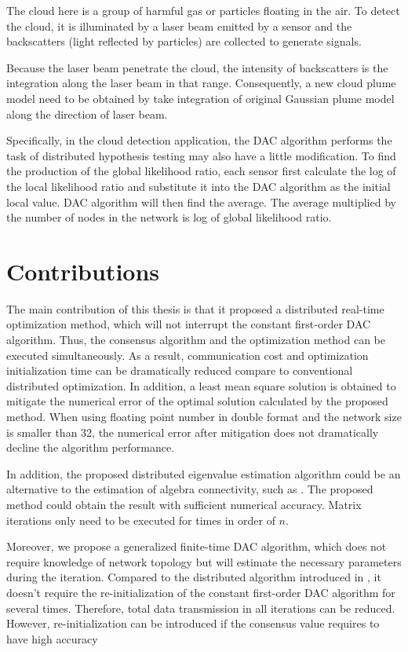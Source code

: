 The cloud here is a group of harmful gas or particles floating in
the air. To detect the cloud, it is illuminated by a laser beam emitted
by a sensor and the backscatters (light reflected by particles) are
collected to generate signals. 

Because the laser beam penetrate the cloud, the intensity of backscatters
is the integration along the laser beam in that range. Consequently,
a new cloud plume model need to be obtained by take integration of
original Gaussian plume model along the direction of laser beam. 

Specifically, in the cloud detection application, the DAC algorithm
performs the task of distributed hypothesis testing may also have
a little modification. To find the production of the global likelihood
ratio, each sensor first calculate the log of the local likelihood
ratio and substitute it into the DAC algorithm as the initial local
value. DAC algorithm will then find the average. The average multiplied
by the number of nodes in the network is log of global likelihood
ratio.


\section{Contributions}

The main contribution of this thesis is that it proposed a distributed
real-time optimization method, which will not interrupt the constant
first-order DAC algorithm. Thus, the consensus algorithm and the optimization
method can be executed simultaneously. As a result, communication
cost and optimization initialization time can be dramatically reduced
compare to conventional distributed optimization. In addition, a least
mean square solution is obtained to mitigate the numerical error of
the optimal solution calculated by the proposed method. When using
floating point number in double format and the network size is smaller
than 32, the numerical error after mitigation does not dramatically
decline the algorithm performance. 

In addition, the proposed distributed eigenvalue estimation algorithm
could be an alternative to the estimation of algebra connectivity,
such as \cite{Yang2010}. The proposed method could obtain the result
with sufficient numerical accuracy. Matrix iterations only need to
be executed for times in order of $n$. 

Moreover, we propose a generalized finite-time DAC algorithm, which
does not require knowledge of network topology but will estimate the
necessary parameters during the iteration. Compared to the distributed
algorithm introduced in \cite{Sundaram2007}, it doesn't require the
re-initialization of the constant first-order DAC algorithm for several
times. Therefore, total data transmission in all iterations can be
reduced. However, re-initialization can be introduced if the consensus
value requires to have high accuracy 

